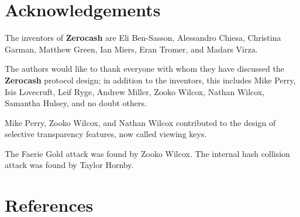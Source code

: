 \documentclass{article}
\newcommand{\termbf}[1]{\textbf{#1}\xspace}
\newcommand{\Zerocash}{\termbf{Zerocash}}
\begin{document}
\section{Acknowledgements}

The inventors of \Zerocash are Eli Ben-Sasson, Alessandro Chiesa,
Christina Garman, Matthew Green, Ian Miers, Eran Tromer, and Madars
Virza.

The authors would like to thank everyone with whom they have discussed
the \Zerocash protocol design; in addition to the inventors, this includes
Mike Perry, Isis Lovecruft, Leif Ryge, Andrew Miller, Zooko Wilcox,
Nathan Wilcox, Samantha Hulsey, and no doubt others.

Mike Perry, Zooko Wilcox, and Nathan Wilcox contributed to the design
of selective transparency features, now called viewing keys.

The Faerie Gold attack was found by Zooko Wilcox.
The internal hash collision attack was found by Taylor Hornby.


\section{References}

\begingroup
\renewcommand{\section}[2]{}


\endgroup
\end{document}
